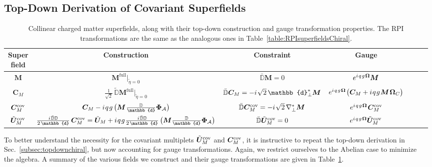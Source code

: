 \documentclass[12pt,document,nofootinbib,superscriptaddress,onecolumn,preprintnumbers,balancelastpage]{article}
\newcommand{\full}{\text{full}}
\newcommand{\s}{\hspace{0.8pt}}
\newcommand{\PP}{\mathbb{d}}
\DeclareRobustCommand{\Sec}[1]{Sec.~\ref{#1}}
\DeclareRobustCommand{\Tab}[1]{Table~\ref{#1}}
\newcommand{\bM}{ \boldsymbol M}
\newcommand{\bPhiA}{ \boldsymbol{\Phi}_\alc}
\newcommand{\bC}{ \boldsymbol C}
\newcommand{\bU}{ \tilde{\boldsymbol U}}
\newcommand{\D}{\mathbb{D}}
\newcommand{\RCA}{\boldsymbol{\Omega}}
\newcommand{\alc}{\mathcal{A}}
\begin{document}
\begin{spacing}{1.2}
\subsection{Top-Down Derivation of Covariant Superfields}

\begin{table}[t]
\renewcommand{\arraystretch}{2}
\setlength{\arrayrulewidth}{.3mm}
\small
\setlength{\tabcolsep}{0.35 em}
\hspace{-10pt}
 \begin{tabular}{ |c || c | c | c | c | c | c|}
    \hline
    Superfield &  Construction & Constraint &  Gauge    \\ \hline \hline
 $\bM $ & $\bM^{\full}\big|_{\tilde{\eta} = 0}$  & $\bar{\D} \bM = 0$ &    $e^{i\s q\s g\s \RCA} \bM$     \\[4pt]  
    $\bC_M $ & $\frac{1}{\sqrt{2}}\, \tilde{\D} \bM^{\full}|_{\tilde{\eta} = 0}$ & $\bar{\D} \bC_M = -i\s\sqrt{2}\, \PP_\perp^* \bM$ &   $e^{i\s q\s g\s \RCA}\s \big( \bC_M + i \s q \s g \s \bM \s \RCA_C  \big)$   \\ [4pt]  
 $ \bC^{\rm cov}_M $ & $\bC_M - i \s q\s g \left( \bM \s \frac{\D}{\PP} \bPhiA \right)$  & $\bar{\D} \bC^{\rm cov}_M = -i\s\sqrt{2}\,\nabla_\perp^* \bM$  &  $e^{i\s q\s g\s \RCA}\s \bC^{\rm cov}_M$     \\[4pt]  
 $\bU^{\rm cov}_M $ & $\frac{i\s \bar{\D} \D}{2\,\PP}\, \bC^{\rm cov}_M = \bU_M + i\s q\s g\s \frac{i\s \bar{\D} \D}{2\, \PP} \left(\bM \frac{\D}{\PP} \bPhiA  \right)$  & $\bar{\D} \bU^{\rm cov}_M = 0$  &  $e^{i\s q\s g \s\RCA} \bU_M^{\rm cov}$     \\[4pt] \hline 
 \end{tabular}
 \caption{Collinear charged matter superfields, along with their top-down construction and gauge transformation properties.
 The RPI transformations are the same as the analogous ones in \Tab{table:RPIsuperfieldsChiral}.
}
\label{Table:transSuperfields}
\end{table}


To better understand the necessity for the covariant multiplets $\bU_M^{\rm cov}$ and $\bC_M^{\rm cov}$, it is instructive to repeat the top-down derivation in \Sec{subsec:topdownchiral}, but now accounting for gauge transformations.
%
Again, we restrict ourselves to the Abelian case to minimize the algebra.
%
A summary of the various fields we construct and their gauge transformations are given in \Tab{Table:transSuperfields}.



\end{spacing}
\end{document}

